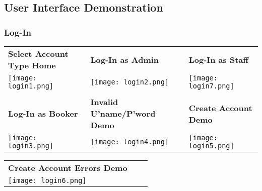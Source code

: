 \documentclass[11pt, english]{article}
\begin{document}
\begin{center}
{}

	\end{center}

\newpage

	\subsection{User Interface Demonstration}

		\subsubsection{Log-In}

	\begin{center}
        	\scriptsize
        \begin{longtable}{p{5cm}p{5cm}p{5cm}}
                \textbf{Select Account Type Home} & \textbf{Log-In as Admin} & \textbf{Log-In as Staff}\\
		\texttt{[image: login1.png]} & \texttt{[image: login2.png]} & \texttt{[image: login7.png]}\\
		& \\
		\textbf{Log-In as Booker} & \textbf{Invalid U'name/P'word Demo} & \textbf{Create Account Demo}\\
		\texttt{[image: login3.png]} & \texttt{[image: login4.png]} & \texttt{[image: login5.png]}\\
        \end{longtable}
        \end{center}

	\begin{center}
        	\scriptsize
        \begin{longtable}{p{5cm}p{5cm}p{5cm}}
                \textbf{Create Account Errors Demo}\\
		\texttt{[image: login6.png]}\\
        \end{longtable}
        \end{center}
\end{document}
